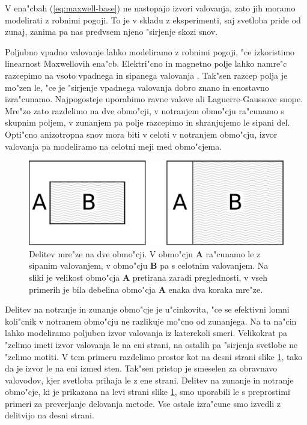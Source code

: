 \documentclass[12pt,twoside,openright,final,a4paper]{report}
\begin{document}
V ena"cbah (\ref{eq:maxwell-base}) ne nastopajo izvori valovanja, zato jih moramo modelirati z robnimi pogoji. 
To je v skladu z eksperimenti, saj svetloba pride od zunaj, zanima pa nas predvsem njeno "sirjenje skozi snov. 

Poljubno vpadno valovanje lahko modeliramo z robnimi pogoji, "ce izkoristimo linearnost Maxwellovih ena"cb. 
Elektri"cno in magnetno polje lahko namre"c razcepimo na vsoto vpadnega in sipanega valovanja \cite{taflove}. 
Tak"sen razcep polja je mo"zen le, "ce je "sirjenje vpadnega valovanja dobro znano in enostavno izra"cunamo. 
Najpogosteje uporabimo ravne valove ali Laguerre-Gaussove snope. 
Mre"zo zato razdelimo na dve obmo"cji, v notranjem obmo"cju ra"cunamo s skupnim poljem, v zunanjem pa polje razcepimo in shranjujemo le sipani del.
Opti"cno anizotropna snov mora biti v celoti v notranjem obmo"cju, izvor valovanja pa modeliramo na celotni meji med obmo"cjema. 

\begin{figure}[h]
 \centering
 \includegraphics[width=.8\textwidth]{wave-source-regions}
 \caption{Delitev mre"ze na dve obmo"cji. V obmo"cju \textbf{A} ra"cunamo le z sipanim valovanjem, v obmo"cju \textbf{B} pa s celotnim valovanjem. Na sliki je velikost obmo"cja \textbf{A} pretirana zaradi preglednosti, v vseh primerih je bila debelina obmo"cja \textbf{A} enaka dva koraka mre"ze. }
 \label{fig:wave-source-regions}
\end{figure}

Delitev na notranje in zunanje obmo"cje je u"cinkovita, "ce se efektivni lomni koli"cnik v notranem obmo"cju ne razlikuje mo"cno od zunanjega. 
Na ta na"cin lahko modeliramo poljuben izvor valovanja iz katerekoli smeri. 
Velikokrat pa "zelimo imeti izvor valovanja le na eni strani, na ostalih pa "sirjenja svetlobe ne "zelimo motiti. 
V tem primeru razdelimo prostor kot na desni strani slike \ref{fig:wave-source-regions}, tako da je izvor le na eni izmed sten. 
Tak"sen pristop je smeselen za obravnavo valovodov, kjer svetloba prihaja le z ene strani. 
Delitev na zunanje in notranje obmo"cje, ki je prikazana na levi strani slike \ref{fig:wave-source-regions}, smo uporabili le s preprostimi primeri za preverjanje delovanja metode. 
Vse ostale izra"cune smo izvedli z delitvijo na desni strani. 
\end{document}

